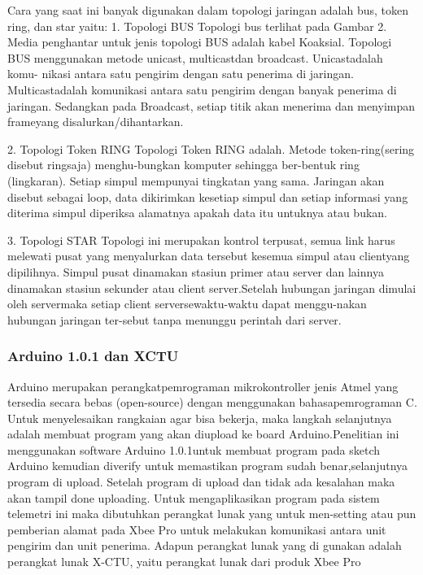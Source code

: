 Cara yang saat ini banyak digunakan  dalam topologi jaringan adalah bus, token ring, dan star yaitu:
1. Topologi BUS 
Topologi bus terlihat pada Gambar 2. Media penghantar untuk jenis topologi BUS adalah kabel Koaksial. Topologi BUS menggunakan metode unicast, multicastdan broadcast. Unicastadalah komu- nikasi antara satu pengirim 
dengan satu penerima di jaringan. Multicastadalah komunikasi antara satu pengirim dengan banyak penerima di jaringan. Sedangkan pada Broadcast, setiap titik akan menerima dan menyimpan frameyang disalurkan/dihantarkan.

2. Topologi Token RING 
Topologi Token RING adalah. Metode token-ring(sering disebut ringsaja) menghu-bungkan komputer sehingga ber-bentuk ring (lingkaran). Setiap 
simpul mempunyai tingkatan yang sama. Jaringan akan disebut sebagai loop, data dikirimkan kesetiap simpul dan setiap informasi yang diterima simpul diperiksa alamatnya apakah data itu untuknya atau bukan.

3. Topologi STAR 
Topologi ini merupakan kontrol terpusat, semua link harus melewati pusat yang menyalurkan data tersebut kesemua simpul atau clientyang dipilihnya. Simpul pusat dinamakan stasiun primer atau 
server dan lainnya dinamakan 
stasiun sekunder atau client server.Setelah hubungan jaringan dimulai oleh servermaka setiap client serversewaktu-waktu dapat menggu-nakan hubungan jaringan ter-sebut tanpa menunggu perintah dari server.

\subsubsection {Arduino 1.0.1 dan XCTU}
Arduino merupakan perangkatpemrograman mikrokontroller jenis Atmel yang tersedia secara bebas (open-source)
dengan menggunakan bahasapemrograman C. Untuk menyelesaikan rangkaian agar bisa bekerja, maka langkah selanjutnya adalah membuat program yang
akan diupload ke board Arduino.Penelitian ini menggunakan software Arduino 1.0.1untuk membuat program pada sketch Arduino kemudian diverify
untuk memastikan program sudah benar,selanjutnya program di upload. Setelah program di upload dan tidak ada kesalahan
maka akan tampil done uploading. Untuk mengaplikasikan program pada sistem telemetri ini maka dibutuhkan perangkat lunak yang untuk men-setting atau pun pemberian alamat pada Xbee Pro untuk melakukan komunikasi antara unit pengirim dan unit penerima. Adapun
perangkat lunak yang di gunakan adalah perangkat lunak X-CTU, yaitu perangkat lunak dari produk Xbee Pro

